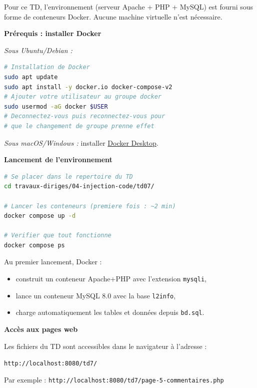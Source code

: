 \documentclass[a4paper,11pt]{article}
\theoremstyle{plain}
\theoremstyle{definition}
\begin{document}
\begin{tcolorbox}[colback=gray!5!white, colframe=gray!60!black, title={Mise en place avec Docker}]
Pour ce TD, l'environnement (serveur Apache + PHP + MySQL) est fourni sous forme de conteneurs Docker. Aucune machine virtuelle n'est nécessaire.

\medskip
\textbf{Prérequis : installer Docker}

\medskip
\textit{Sous Ubuntu/Debian :}
\begin{lstlisting}[language=bash,numbers=none]
# Installation de Docker
sudo apt update
sudo apt install -y docker.io docker-compose-v2
# Ajouter votre utilisateur au groupe docker
sudo usermod -aG docker $USER
# Deconnectez-vous puis reconnectez-vous pour
# que le changement de groupe prenne effet
\end{lstlisting}

\textit{Sous macOS/Windows :} installer \href{https://www.docker.com/products/docker-desktop/}{Docker Desktop}.

\medskip
\textbf{Lancement de l'environnement}

\begin{lstlisting}[language=bash,numbers=none]
# Se placer dans le repertoire du TD
cd travaux-diriges/04-injection-code/td07/

# Lancer les conteneurs (premiere fois : ~2 min)
docker compose up -d

# Verifier que tout fonctionne
docker compose ps
\end{lstlisting}

Au premier lancement, Docker :
\begin{itemize}
    \item construit un conteneur Apache+PHP avec l'extension \texttt{mysqli},
    \item lance un conteneur MySQL 8.0 avec la base \texttt{l2info},
    \item charge automatiquement les tables et données depuis \texttt{bd.sql}.
\end{itemize}

\medskip
\textbf{Accès aux pages web}

Les fichiers du TD sont accessibles dans le navigateur à l'adresse :

\begin{center}
\texttt{http://localhost:8080/td7/}
\end{center}

Par exemple : \texttt{http://localhost:8080/td7/page-5-commentaires.php}


\end{tcolorbox}
\end{document}
